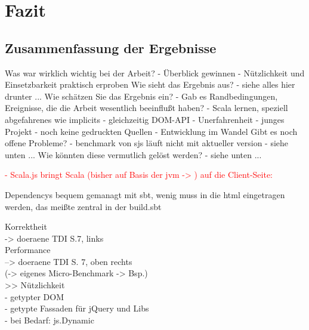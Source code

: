 \documentclass[a4paper, 12pt, hidelinks, listof=totoc, listoftables=totoc, bibliography=totoc]{scrreprt}
\newcommand{\TODO}[1]{\textcolor{red}{#1}\newline}
\begin{document}
\chapter{Fazit}\label{chap:conclusion}

 \section{Zusammenfassung der Ergebnisse}

Was war wirklich wichtig bei der Arbeit?
- Überblick gewinnen
- Nützlichkeit und Einsetzbarkeit praktisch erproben
Wie sieht das Ergebnis aus?
- siehe alles hier drunter ...
Wie schätzen Sie das Ergebnis ein?
- 
Gab es Randbedingungen, Ereignisse, die die Arbeit wesentlich beeinflußt haben?
- Scala lernen, speziell abgefahrenes wie implicits
- gleichzeitig DOM-API
- Unerfahrenheit
- junges Projekt
	- noch keine gedruckten Quellen
	- Entwicklung im Wandel
Gibt es noch offene Probleme?
- benchmark von sjs läuft nicht mit aktueller version
- siehe unten ...
Wie könnten diese vermutlich gelöst werden?
- siehe unten ...





\TODO{- Scala.js bringt Scala (bisher auf Basis der jvm -> %
) auf die Client-Seite:}


Dependencys bequem gemanagt mit sbt, wenig muss in die html eingetragen werden, das meißte zentral in der build.sbt


   Korrektheit \\
	-> doeraene TDI S.7, links \\
   Performance \\
	--> doeraene TDI S. 7, oben rechts \\
	(-> eigenes Micro-Benchmark -> Bsp.) \\
>> Nützlichkeit \\
	- getypter \ac{DOM} \\
	- getypte Fassaden für jQuery und Libs \\
	- bei Bedarf: js.Dynamic \\
\end{document}

